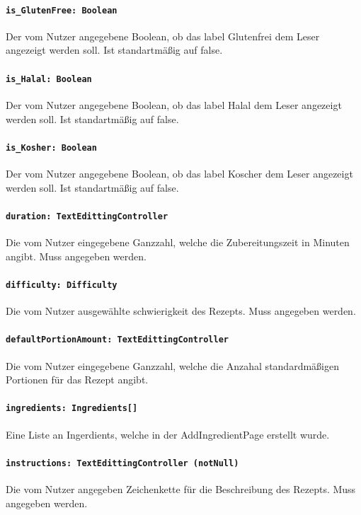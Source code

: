 \documentclass[parskip=full]{scrartcl}
\begin{document}
            \paragraph*{\texttt{is\_GlutenFree: Boolean}} Der vom Nutzer angegebene Boolean, ob das \gls{label} Glutenfrei dem Leser angezeigt werden soll.  Ist standartmäßig auf false.
            \paragraph*{\texttt{is\_Halal: Boolean}} Der vom Nutzer angegebene Boolean, ob das \gls{label} Halal dem Leser angezeigt werden soll.  Ist standartmäßig auf false.
            \paragraph*{\texttt{is\_Kosher: Boolean}} Der vom Nutzer angegebene Boolean, ob das \gls{label} Koscher dem Leser angezeigt werden soll.  Ist standartmäßig auf false.
            \paragraph*{\texttt{duration: TextEdittingController}} Die vom Nutzer eingegebene Ganzzahl, welche die Zubereitungszeit in Minuten angibt. Muss angegeben werden.
            \paragraph*{\texttt{difficulty: Difficulty}} Die vom Nutzer ausgewählte \gls{schwierigkeit} des Rezepts. Muss angegeben werden. 
            \paragraph*{\texttt{defaultPortionAmount: TextEdittingController}} Die vom Nutzer eingegebene Ganzzahl, welche die Anzahal standardmäßigen Portionen für das Rezept angibt.
            \paragraph*{\texttt{ingredients: Ingredients[]}} Eine Liste an Ingerdients, welche in der AddIngredientPage erstellt wurde.
            \paragraph*{\texttt{instructions: TextEdittingController (notNull)}} Die vom Nutzer angegeben Zeichenkette für die Beschreibung des Rezepts. Muss angegeben werden.
\end{document}
